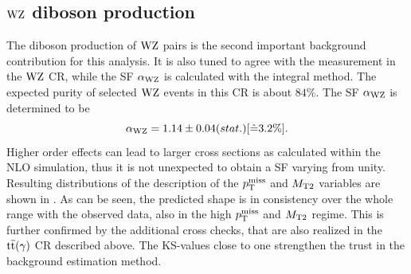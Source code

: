 \subsection{$\mathrm{W}\mathrm{Z}$ diboson production}
The diboson production of $\mathrm{W}\mathrm{Z}$ pairs is the second important background contribution for this analysis. It is also tuned to agree with the measurement in the $\mathrm{W}\mathrm{Z}$ CR, while the SF $\alpha_{\mathrm{W}\mathrm{Z}}$ is calculated with the integral method. The expected purity of selected $\mathrm{W}\mathrm{Z}$ events in this CR is about $84\%$.
The SF $\alpha_{\mathrm{W}\mathrm{Z}}$ is determined to be
\begin{equation}\label{eq:AlphaWZ}
 \alpha_{\mathrm{W}\mathrm{Z}}=1.14 \pm 0.04 (stat.) [\hat{=}3.2\%].
\end{equation}
Higher order effects can lead to larger cross sections as calculated within the NLO simulation, thus it is not unexpected to obtain a SF varying from unity. Resulting distributions of the description of the $p_{\mathrm{T}}^\text{miss}$ and $M_{\mathrm{T2}}$ variables are shown in . As can be seen, the predicted shape is in consistency over the whole range with the observed data, also in the high $p_{\mathrm{T}}^\text{miss}$ and $M_{\mathrm{T2}}$ regime. This is further confirmed by the additional cross checks, that are also realized in the ${\mathrm{t}\overline{\mathrm{t}}}(\gamma)$ CR described above. The KS-values close to one strengthen the trust in the background estimation method.

